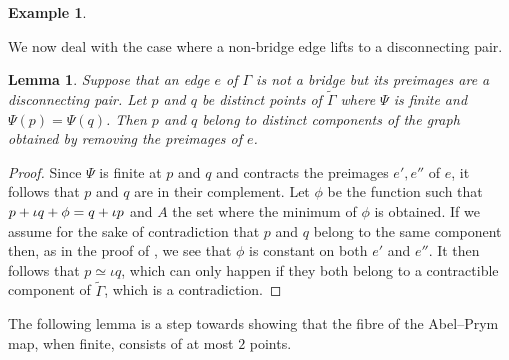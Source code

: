 \documentclass[11pt]{article}
\newtheorem{lemma}[theo]{Lemma}
\theoremstyle{definition}
\newtheorem{exam}[theo]{Example}
\numberwithin{equation}{section}
\theoremstyle{definition}
\newcommand{\wt}[1]{\widetilde{#1}}
\let\ddiv\relax
\DeclareMathOperator{\ddiv}{div}
\begin{document}
\begin{exam}
\begin{figure}[ht]
\begin{subfigure}[t]{0.4\linewidth}
 \caption{}
\end{subfigure}
\hfill
 \caption[below]{ }
  \label{figpic9}
 \end{figure}
\end{exam}

We now deal with the case where a non-bridge edge lifts to a disconnecting pair.  

\begin{lemma}\label{lem:AbelPrymSeparatesTwoConnectedComponents2}
    Suppose that an edge $e$ of $\Gamma$ is not a bridge but its preimages are a disconnecting pair. Let $p$ and $q$ be distinct points of $\wt\Gamma$ where  $\Psi$ is finite and  $\Psi(p) = \Psi(q)$. Then $p$ and $q$ belong to distinct components of the graph obtained by removing the preimages of $e$. 
    \end{lemma}

\begin{proof}
Since $\Psi$ is finite at $p$ and $q$ and contracts the preimages $e',e''$ of $e$, it follows that $p$ and $q$ are in their complement. Let $\phi$ be the function such that $p + \iota q + \ddiv \phi = q + \iota p$ and $A$ the set where the minimum of $\phi$ is obtained.  If we assume for the sake of contradiction that $p$ and $q$ belong to the same  component then, as in the proof of , we see that $\phi$ is constant on both $e'$ and $e''$. It then follows that $p\simeq \iota q$, which can only happen if they both belong to a contractible component of $\wt\Gamma$, which is a contradiction. 
\end{proof}

The following lemma is a step towards showing that the fibre of the Abel--Prym map, when finite, consists of at most $2$ points. 
\end{document}
